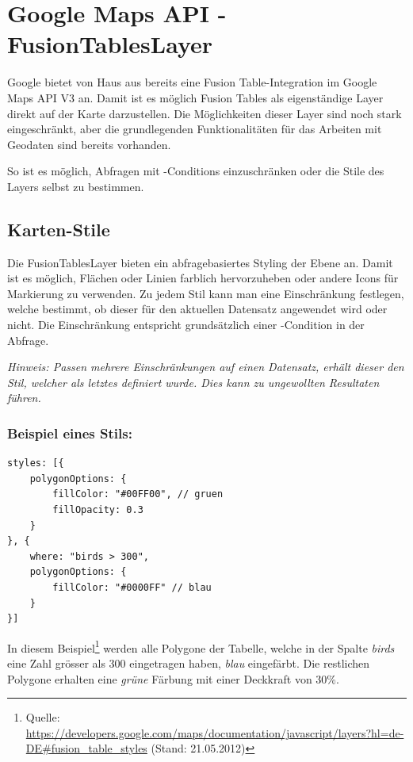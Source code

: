 \section{Google Maps API - FusionTablesLayer}
\label{gmap-api-fusiontableslayer}
Google bietet von Haus aus bereits eine Fusion Table-Integration im Google Maps \gls{API} V3 an. Damit ist es möglich Fusion Tables als eigenständige Layer direkt auf der Karte darzustellen.
Die Möglichkeiten dieser Layer sind noch stark eingeschränkt, aber die grundlegenden Funktionalitäten für das Arbeiten mit Geodaten sind bereits vorhanden.

So ist es möglich, Abfragen mit -Conditions einzuschränken oder die Stile des Layers selbst zu bestimmen.

\subsection{Karten-Stile}
\label{fusiontableslayer-styles}
Die FusionTablesLayer bieten ein abfragebasiertes Styling der Ebene an. Damit ist es möglich, Flächen oder Linien farblich hervorzuheben oder andere Icons für Markierung zu verwenden. Zu jedem Stil kann man eine Einschränkung festlegen, welche bestimmt, ob dieser für den aktuellen Datensatz angewendet wird oder nicht. Die Einschränkung entspricht grundsätzlich einer -Condition in der Abfrage.

\emph{Hinweis: Passen mehrere Einschränkungen auf einen Datensatz, erhält dieser den Stil, welcher als letztes definiert wurde. Dies kann zu ungewollten Resultaten führen.}

\subsubsection{Beispiel eines Stils:}
\lstset{language=JavaScript}
\begin{lstlisting}[caption=Beispiel eines FusionTablesLayer-Stylings, label=fusiontableslayers-styles-example]
styles: [{
	polygonOptions: {
		fillColor: "#00FF00", // gruen
		fillOpacity: 0.3
	}
}, {
	where: "birds > 300",
	polygonOptions: {
		fillColor: "#0000FF" // blau
	}
}]
\end{lstlisting}

In diesem Beispiel\footnote{Quelle: \url{https://developers.google.com/maps/documentation/javascript/layers?hl=de-DE\#fusion_table_styles} (Stand: 21.05.2012)} werden alle Polygone der Tabelle, welche in der Spalte \emph{birds} eine Zahl grösser als 300 eingetragen haben, \emph{blau} eingefärbt. Die restlichen Polygone erhalten eine \emph{grüne} Färbung mit einer Deckkraft von 30\%.

